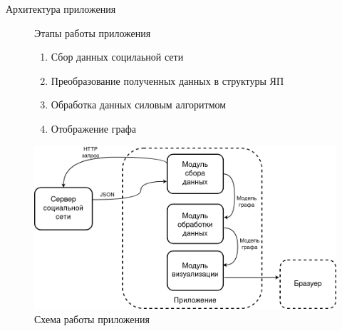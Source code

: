 \documentclass{beamer}
\begin{document}
\begin{frame}{Архитектура приложения }

	\begin{figure}
		\begin{minipage}{0.5\textwidth}
			\begin{alertblock}{Этапы работы приложения}
        \begin{enumerate}
          \item Сбор данных социлаьной сети
          \item Преобразование полученных данных в структуры ЯП
          \item Обработка данных силовым алгоритмом
          \item Отображение графа
        \end{enumerate}
			\end{alertblock}
		\end{minipage}
		\hfill
		\begin{minipage}{0.477777777\textwidth}
			\centering
			\includegraphics[width=\linewidth]{./imgs/app_scheme.png}
			\caption{Схема работы приложения}
		\end{minipage}
	\end{figure}

\end{frame}
\end{document}
